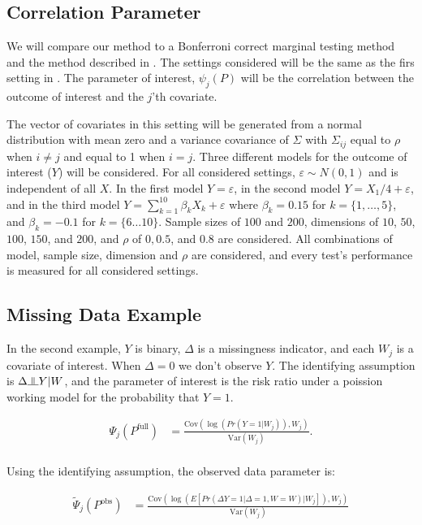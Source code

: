 \documentclass{article}
\newcommand{\indep}{\raisebox{0.05em}{\rotatebox[origin=c]{90}{$\models$}}}
\begin{document}
\subsection{Correlation Parameter}
We will compare our method to a Bonferroni correct marginal testing method and the method described in \citep{zhang_comment_2015}.  The settings considered will be the same as the firs setting in \citep{mckeague_adaptive_2015}.  The parameter of interest, $\psi_j(P)$ will be the correlation between the outcome of interest and the $j$'th covariate. 

The vector of covariates in this setting will be generated from a normal distribution with mean zero and a variance covariance of $\Sigma$ with $\Sigma_{ij}$ equal to $\rho$ when $i \neq j$ and equal to 1 when $i = j$. Three different models for the outcome of interest ($Y$) will be considered. For all considered settings, $\varepsilon \sim N(0, 1)$ and is independent of all $X$. In the first model $Y = \varepsilon$, in the second model $Y = X_1 / 4 + \varepsilon$, and in the third model $Y = \sum_{k = 1}^{10} \beta_k X_k + \varepsilon$ where $\beta_k = 0.15$ for $k = \{1, \dots, 5\}$, and $\beta_k = -0.1$ for $k = \{6 \dots 10\}$.  Sample sizes of $100$ and $200$, dimensions of $10$, $50$, $100$, $150$, and $200$, and $\rho$ of  $0, 0.5$, and $0.8$ are considered.  All combinations of model, sample size, dimension and $\rho$ are considered, and every test's performance is measured for all considered settings.

\subsection{Missing Data Example}
In the second example, $Y$ is binary, $\Delta$ is a missingness indicator, and each $W_j$ is a covariate of interest.  When $\Delta = 0$ we don't observe $Y$.  The identifying assumption is $\Delta \indep Y | W$, and the parameter of interest is the risk ratio under a poission working model for the probability that $Y = 1$.

\begin{align*}
	\Psi_{j}\left(P^{\text{full}}\right) &= \frac{\text{Cov}\left(\log\left(Pr \left(Y = 1 |  W_j\right)\right), W_j\right)}{\text{Var}(W_j)}.\\
\end{align*}

Using the identifying assumption, the observed data parameter is:

\begin{align*}
	\tilde{\Psi}_{j}\left(P^{\text{obs}}\right)&= \frac{\text{Cov}\left(\log\left(E\left[Pr \left(\Delta  Y = 1 | \Delta = 1, W = W\right) |  W_j\right]\right), W_j\right)}{\text{Var}(W_j)}\\
\end{align*}
\end{document}
